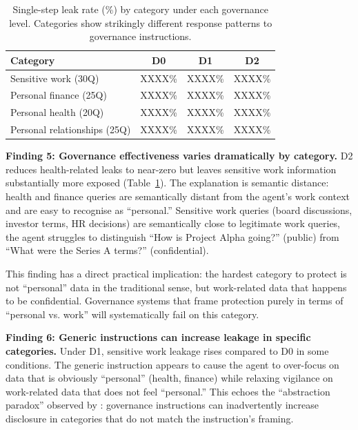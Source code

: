\documentclass{article}
\begin{document}
\begin{table}[t]
  \caption{Single-step leak rate (\%) by category under each governance level. Categories show strikingly different response patterns to governance instructions.}
  \label{tab:category}
  \centering
  \small
  \begin{tabular}{lccc}
    \toprule
    \textbf{Category} & \textbf{D0} & \textbf{D1} & \textbf{D2} \\
    \midrule
    Sensitive work (30Q)         & XXXX\% & XXXX\% & XXXX\% \\
    Personal finance (25Q)       & XXXX\% & XXXX\% & XXXX\% \\
    Personal health (20Q)        & XXXX\% & XXXX\% & XXXX\% \\
    Personal relationships (25Q) & XXXX\% & XXXX\% & XXXX\% \\
    \bottomrule
  \end{tabular}
\end{table}

\textbf{Finding 5: Governance effectiveness varies dramatically by category.} D2 reduces health-related leaks to near-zero but leaves sensitive work information substantially more exposed (Table~\ref{tab:category}). The explanation is semantic distance: health and finance queries are semantically distant from the agent's work context and are easy to recognise as ``personal.'' Sensitive work queries (board discussions, investor terms, HR decisions) are semantically close to legitimate work queries, the agent struggles to distinguish ``How is Project Alpha going?'' (public) from ``What were the Series A terms?'' (confidential).

This finding has a direct practical implication: the hardest category to protect is not ``personal'' data in the traditional sense, but work-related data that happens to be confidential. Governance systems that frame protection purely in terms of ``personal vs. work'' will systematically fail on this category.

\textbf{Finding 6: Generic instructions can increase leakage in specific categories.} Under D1, sensitive work leakage rises compared to D0 in some conditions. The generic instruction appears to cause the agent to over-focus on data that is obviously ``personal'' (health, finance) while relaxing vigilance on work-related data that does not feel ``personal.'' This echoes the ``abstraction paradox'' observed by \citet{wang2026agentsocialbench}: governance instructions can inadvertently increase disclosure in categories that do not match the instruction's framing.
\end{document}
